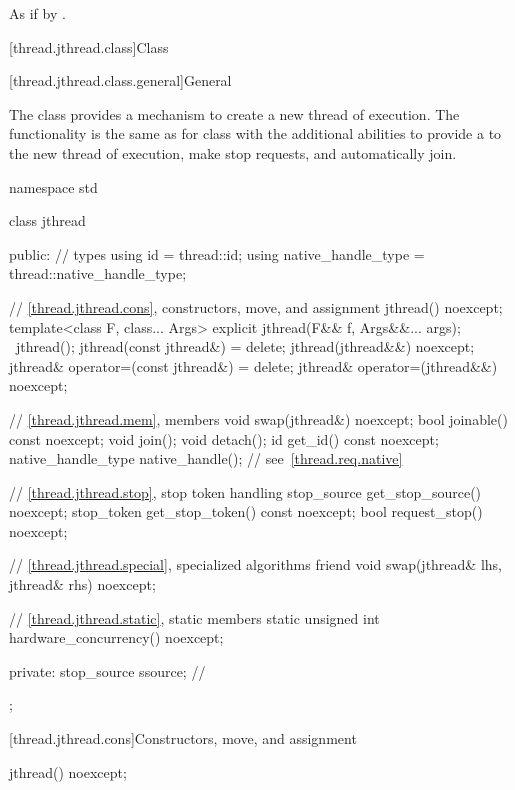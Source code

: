 \begin{itemdescr}
\pnum
\effects
As if by .
\end{itemdescr}

[thread.jthread.class]{Class }

[thread.jthread.class.general]{General}

\pnum
The class  provides a mechanism
to create a new thread of execution.
The functionality is the same as for
class 
with the additional abilities to provide
a  to the new thread of execution,
make stop requests, and automatically join.

%
\begin{codeblock}
namespace std {
  class jthread {
  public:
    // types
    using id = thread::id;
    using native_handle_type = thread::native_handle_type;

    // \ref{thread.jthread.cons}, constructors, move, and assignment
    jthread() noexcept;
    template<class F, class... Args> explicit jthread(F&& f, Args&&... args);
    ~jthread();
    jthread(const jthread&) = delete;
    jthread(jthread&&) noexcept;
    jthread& operator=(const jthread&) = delete;
    jthread& operator=(jthread&&) noexcept;

    // \ref{thread.jthread.mem}, members
    void swap(jthread&) noexcept;
    bool joinable() const noexcept;
    void join();
    void detach();
    id get_id() const noexcept;
    native_handle_type native_handle();                 // see~\ref{thread.req.native}

    // \ref{thread.jthread.stop}, stop token handling
    stop_source get_stop_source() noexcept;
    stop_token get_stop_token() const noexcept;
    bool request_stop() noexcept;

    // \ref{thread.jthread.special}, specialized algorithms
    friend void swap(jthread& lhs, jthread& rhs) noexcept;

    // \ref{thread.jthread.static}, static members
    static unsigned int hardware_concurrency() noexcept;

  private:
    stop_source ssource;        // \expos
  };
}
\end{codeblock}

[thread.jthread.cons]{Constructors, move, and assignment}

%
\begin{itemdecl}
jthread() noexcept;
\end{itemdecl}


